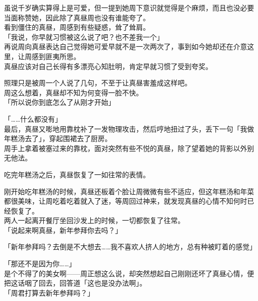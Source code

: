 虽说千岁确实算得上是可爱，但一提到她周下意识就觉得是个麻烦，而且也没必要当面称赞她，因此除了真昼周也没有谁能夸了。\\

看到僵住的真昼，周感到有些疑惑，耸了耸肩。\\

「我说，你早就习惯被这么说了吧？也不差我一个」\\

再说周向真昼表达自己觉得她可爱早就不是一次两次了，事到如今她却还在介意这里，让周感到匪夷所思。\\

真昼应该对自己长得有多漂亮心知肚明，肯定早就习惯了受到夸奖。

照理只是被周一个人说了几句，不至于让真昼害羞成这样吧。\\

周这么想着，真昼却不知为何变得一脸不快。\\

「所以说你到底怎么了从刚才开始」

「……什么都没有」\\

最后，真昼又嘭地用靠枕补了一发物理攻击，然后哼地扭过了头，丢下一句「我做年糕汤去了」，穿起围裙去了厨房。\\

周手上拿着被塞过来的靠枕，面对突然有些不悦的真昼，除了望着她的背影以外别无他法。\\

\vspace{2\baselineskip}

吃完年糕汤之后，真昼恢复了一如往常的表情。

刚开始吃年糕汤的时候，真昼还板着个脸让周微微有些不适应，但这年糕汤和年菜都很美味，让周吃着吃着就入了迷，等周回过神来，就发现真昼的心情不知何时已经恢复了。\\

两人一起离开餐厅坐回沙发上的时候，一切都恢复了往常。\\

「说起来啊真昼，新年参拜你去吗？」

「新年参拜吗？去倒是不大想去……我不喜欢人挤人的地方，总有种被盯着的感觉」

「那还不是因为你……」\\

是个不得了的美女啊——周正想这么说，却突然想起自己刚刚还坏了真昼心情，便把这话咽了回去，回答道「这也是没办法啊」。\\

「周君打算去新年参拜吗？」

